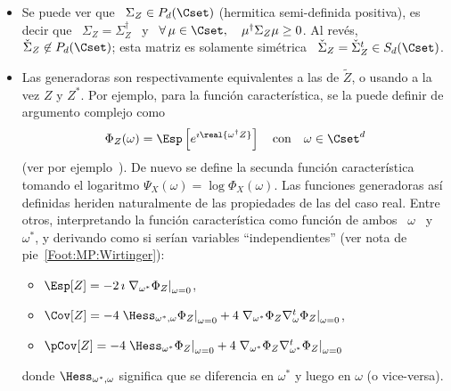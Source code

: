 \begin{itemize}
\begin{itemize}
    $\Sigma_{X,Y}$  \  a  partir  de  \ $\Sigma_Z$  \  y  \  $\check{\Sigma}_Z$;
    Claramente,  los  momentos  centrales de  orden  2  son  dados por  ambas  \
    $\Sigma_Z$ \ y \ $\check{\Sigma}_Z$.
  \end{itemize}
  Los momentos  as\'i definidos heriden  naturalmente de las propiedades  de las
  del caso real.
%
\item  Se puede  ver que  \ $\Sigma_Z  \in P_d(\Cset)$  (hermitica semi-definida
  positiva), es decir que \ $\Sigma_Z = \Sigma_Z^\dag$ \ y \ $\forall \, \mu \in
  \Cset,  \quad \mu^\dag  \Sigma_Z \mu  \ge 0$.   Al  rev\'es, $\check{\Sigma}_Z
  \not\in P_d(\Cset)$; esta matriz  es solamente sim\'etrica \ $\check{\Sigma}_Z
  = \check{\Sigma}_Z^t \in S_d(\Cset)$.
%
\item Las generadoras son respectivamente equivalentes a las de $\widetilde{Z}$,
  o  usando   a  la  vez   $Z$  y  $Z^*$.    Por  ejemplo,  para   la  funci\'on
  caracter\'istica, se la puede definir de argumento complejo como
  \[
  \Phi_Z(\omega)  =  \Esp\left[ e^{\imath  \real{\omega^\dag  Z}} \right]  \quad
  \mbox{con} \quad \omega \in \Cset^d
  \]
  (ver  por  ejemplo~\cite[Cap.~17]{Lap17}).   De  nuevo se  define  la  secunda
  funci\'on  caracter\'istica  tomando   el  logaritmo  $\Psi_X(\omega)  =  \log
  \Phi_X(\omega)$.    Las   funciones   generadoras  as\'i   definidas   heriden
  naturalmente  de  las  propiedades  de   las  del  caso  real.   Entre  otros,
  interpretando la funci\'on caracter\'istica como funci\'on de ambos \ $\omega$
  \ y  \ $\omega^*$, y  derivando como si ser\'ian  variables ``independientes''
  (ver nota de pie~\ref{Foot:MP:Wirtinger}):
  \begin{itemize}
  \item $\Esp[Z]  = - 2 \, \imath  \left. \nabla_{\omega^*} \Phi_Z  \right|_{\omega =
      0}$,
  \item $\Cov[Z] = - 4 \left. \Hess_{\omega^*,\omega} \Phi_Z \right|_{\omega = 0} +
    4 \left. \nabla_{\omega^*}  \Phi_Z \nabla_{\omega}^t \Phi_Z  \right|_{\omega =
      0}$,
  \item  $\pCov[Z] =  - 4 \left.  \Hess_{\omega^*}  \Phi_Z \right|_{\omega  = 0}  +
    4 \left. \nabla_{\omega^*} \Phi_Z \nabla_{\omega^*}^t \Phi_Z \right|_{\omega =
      0}$
  \end{itemize}
  donde $\Hess_{\omega^*,\omega}$  significa que  se diferencia en  $\omega^*$ y
  luego en $\omega$ (o vice-versa).
\end{itemize}

